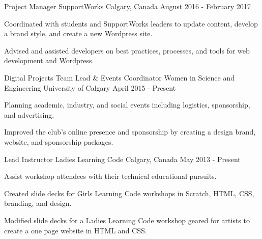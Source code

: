 \begin{cventries}
  \cventry
    {Project Manager}
    {SupportWorks}
    {Calgary, Canada}
    {August 2016 - February 2017}
    {
      \begin{cvitems}
        \item {Coordinated with students and SupportWorks leaders to update content, develop a brand style, and create a new Wordpress site.}
        \item {Advised and assisted developers on best practices, processes, and tools for web development and Wordpress.}
      \end{cvitems}
    }
  \cventry
    {Digital Projects Team Lead \& Events Coordinator}
    {Women in Science and Engineering}
    {University of Calgary}
    {April 2015 - Present}
    {
      \begin{cvitems}
        \item {Planning academic, industry, and social events including logistics, sponsorship, and advertising.}
        \item {Improved the club's online presence and sponsorship by creating a design brand, website, and sponsorship packages.}
      \end{cvitems}
    }
  \cventry
    {Lead Instructor}
    {Ladies Learning Code}
    {Calgary, Canada}
    {May 2013 - Present}
    {
      \begin{cvitems}
        \item {Assist workshop attendees with their technical educational pursuits.}
        \item {Created slide decks for Girls Learning Code workshops in Scratch, HTML, CSS, branding, and design.}
        \item {Modified slide decks for a Ladies Learning Code workshop geared for artists to create a one page website in HTML and CSS.}
      \end{cvitems}
    }

\end{cventries}
